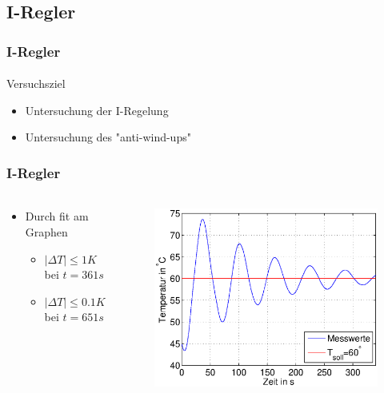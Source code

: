 \subsection{I-Regler} %
\label{sub:I-Regler}
\begin{frame}
    \frametitle{I-Regler}
    \framesubtitle{}
    \begin{block}{Versuchsziel}
        \begin{itemize}
            \item Untersuchung der I-Regelung 
            \item Untersuchung des "anti-wind-ups"
        \end{itemize}
    \end{block}
\end{frame}
\begin{frame}
    \frametitle{I-Regler}
    \framesubtitle{}
    \begin{columns}[c]
             \begin{block}{}
                \begin{itemize} 
                    \item Durch fit am Graphen
                        \begin{itemize}
                            \item $|\Delta T| \leq 1K$ bei $t=361s$
                            \item $|\Delta T| \leq 0.1K$ bei $t=651s$
                        \end{itemize}
                \end{itemize}
             \end{block}
            \begin{figure}[H]
            \begin{center}
                    \includegraphics[scale=0.3]{./img/plots/2_c_100.eps}

\end{center}
\end{figure}
\end{columns}
\end{frame}
